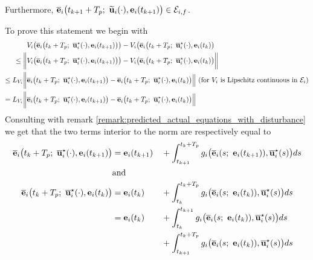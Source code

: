 Furthermore, $\overline{\vect{e}}_i\big(t_{k+1} + T_p;\ \widetilde{\vect{u}}_i(\cdot), \vect{e}_i(t_{k+1}) \big) \in \mathcal{E}_{i,f}$.
\begin{gg_box}
To prove this statement we begin with
\begin{align}
  & V_i\big(\overline{\vect{e}}_i\big(t_k + T_p;\ \overline{\vect{u}}_i^{\star}(\cdot), \vect{e}_i(t_{k+1})\big)\big)
    - V_i\big(\overline{\vect{e}}_i\big(t_k + T_p;\ \overline{\vect{u}}_i^{\star}(\cdot), \vect{e}_i(t_k)\big) \\
  \leq \bigg\| & V_i\big(\overline{\vect{e}}_i\big(t_k + T_p;\ \overline{\vect{u}}_i^{\star}(\cdot), \vect{e}_i(t_{k+1})\big)\big)
    - V_i\big(\overline{\vect{e}}_i\big(t_k + T_p;\ \overline{\vect{u}}_i^{\star}(\cdot), \vect{e}_i(t_k)\big) \bigg \| \\
  \leq L_{V_i}\bigg \|& \overline{\vect{e}}_i\big(t_k + T_p;\ \overline{\vect{u}}_i^{\star}(\cdot), \vect{e}_i(t_{k+1})\big)
    - \overline{\vect{e}}_i\big(t_k + T_p;\ \overline{\vect{u}}_i^{\star}(\cdot), \vect{e}_i(t_k) \big)\Big\|
    \text{ (for } V_i \text{ is Lipschitz continuous in } \mathcal{E}_i \text{)} \\
  =  L_{V_i}\bigg \| & \overline{\vect{e}}_i\big(t_k + T_p;\ \overline{\vect{u}}_i^{\star}(\cdot), \vect{e}_i(t_{k+1})\big)
    - \overline{\vect{e}}_i\big(t_k + T_p;\ \overline{\vect{u}}_i^{\star}(\cdot), \vect{e}_i(t_k) \big)\Big\|
\label{eq:from_DV_to_De}
\end{align}
Consulting with remark \eqref{remark:predicted_actual_equations_with_disturbance}
we get that the two terms interior to the norm are respectively equal to
\begin{alignat}{2}
  \overline{\vect{e}}_i\big(t_k + T_p;\ \overline{\vect{u}}_i^{\star}(\cdot), \vect{e}_i(t_{k+1})\big)
    &= \vect{e}_i(t_{k+1}) &&+ \int_{t_{k+1}}^{t_k + T_p} g_i\big(\overline{\vect{e}}_i(s;\ \vect{e}_i(t_{k+1})), \overline{\vect{u}}_i^{\star}(s) \big)ds \\
    &\text{and}\\
  \overline{\vect{e}}_i\big(t_k + T_p;\ \overline{\vect{u}}_i^{\star}(\cdot), \vect{e}_i(t_k)\big)
    &= \vect{e}_i(t_k)     &&+ \int_{t_k}^{t_k + T_p} g_i\big(\overline{\vect{e}}_i(s;\ \vect{e}_i(t_k)), \overline{\vect{u}}_i^{\star}(s) \big)ds \\
    &= \vect{e}_i(t_k)     &&+ \int_{t_k}^{t_{k+1}} g_i\big(\overline{\vect{e}}_i(s;\ \vect{e}_i(t_k)), \overline{\vect{u}}_i^{\star}(s) \big)ds \\
    &                      &&+ \int_{t_{k+1}}^{t_k + T_p} g_i\big(\overline{\vect{e}}_i(s;\ \vect{e}_i(t_k)), \overline{\vect{u}}_i^{\star}(s) \big)ds \\

\end{alignat}
\end{gg_box}
